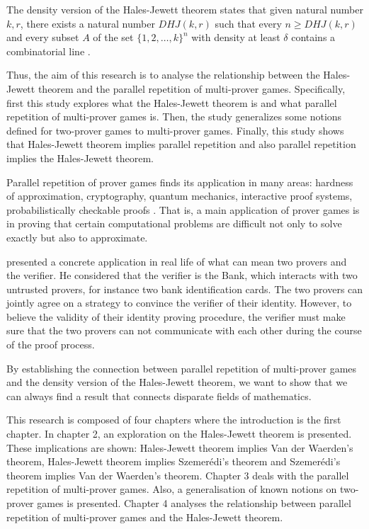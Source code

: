 
The density version of the Hales-Jewett theorem states that given natural number $k,r$, there exists a natural number $DHJ(k,r)$ such that every $n\geq DHJ(k,r)$ and every subset $A$ of the set $\{1,2,\ldots,k\}^n$ with density at least $\delta$  contains a  combinatorial line  \citep{polymath2012new}.

Thus, the aim of this research is to analyse the relationship between the Hales-Jewett theorem and the parallel repetition of multi-prover games. Specifically, first  this study explores what  the Hales-Jewett theorem is and what  parallel repetition of multi-prover games is. Then, the study  generalizes some notions defined for two-prover games to multi-prover games.  Finally, this study shows that Hales-Jewett theorem implies parallel repetition and also parallel repetition implies the Hales-Jewett theorem.

Parallel repetition of prover games finds its application in many areas: hardness of approximation, cryptography, quantum mechanics, interactive proof systems, probabilistically checkable proofs  \cite{tamaki2015parallel, dinur2016multiplayer}. 
 That is, a main application of prover games is in proving that certain computational problems are difficult not only to solve exactly but also to approximate.

 \citep{ben1990efficient} presented a concrete application in real life of what can mean  two provers and the verifier. He considered that the verifier is the Bank, which interacts with two untrusted provers, for instance two bank identification cards. The two provers can jointly agree on a strategy to convince the verifier of their identity. However, to believe the validity of their identity proving procedure, the verifier must make sure that the two provers can not communicate with each other during the course of the proof process.


By establishing the connection between parallel repetition of multi-prover games and the density version of the Hales-Jewett theorem, we want to show that we can always find a result that connects disparate fields of mathematics.

This research is composed of four chapters where the introduction is the first chapter. In chapter 2, an exploration on the Hales-Jewett theorem is presented. These implications are shown:  Hales-Jewett theorem implies Van der Waerden's theorem, Hales-Jewett theorem implies Szemerédi's theorem and Szemerédi's theorem implies Van der Waerden's theorem. Chapter 3 deals with the parallel repetition of  multi-prover games. Also, a generalisation of  known notions on two-prover games is presented. Chapter 4 analyses the relationship between parallel repetition of multi-prover games and the Hales-Jewett theorem.  




%
%





